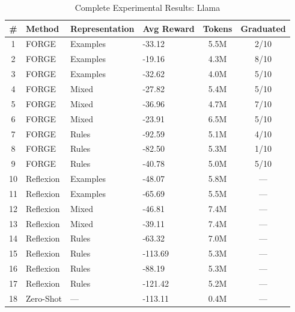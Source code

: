 \documentclass[sigconf]{acmart}
\begin{document}
\begin{table}[htbp]
  \centering
  \scriptsize
  \caption{Complete Experimental Results: Llama}
  \label{tab:full-results-llama}
  \begin{tabular}{clllcc}
  \toprule
  \textbf{\#} & \textbf{Method} & \textbf{Representation} & \textbf{Avg Reward} & \textbf{Tokens} & \textbf{Graduated} \\
  \midrule
  1 & FORGE & Examples & -33.12 & 5.5M & 2/10 \\
  2 & FORGE & Examples & -19.16 & 4.3M & 8/10 \\
  3 & FORGE & Examples & -32.62 & 4.0M & 5/10 \\
  4 & FORGE & Mixed & -27.82 & 5.4M & 5/10 \\
  5 & FORGE & Mixed & -36.96 & 4.7M & 7/10 \\
  6 & FORGE & Mixed & -23.91 & 6.5M & 5/10 \\
  7 & FORGE & Rules & -92.59 & 5.1M & 4/10 \\
  8 & FORGE & Rules & -82.50 & 5.3M & 1/10 \\
  9 & FORGE & Rules & -40.78 & 5.0M & 5/10 \\
  \midrule
  10 & Reflexion & Examples & -48.07 & 5.8M & --- \\
  11 & Reflexion & Examples & -65.69 & 5.5M & --- \\
  12 & Reflexion & Mixed & -46.81 & 7.4M & --- \\
  13 & Reflexion & Mixed & -39.11 & 7.4M & --- \\
  14 & Reflexion & Rules & -63.32 & 7.0M & --- \\
  15 & Reflexion & Rules & -113.69 & 5.3M & --- \\
  16 & Reflexion & Rules & -88.19 & 5.3M & --- \\
  17 & Reflexion & Rules & -121.42 & 5.2M & --- \\
  \midrule
  18 & Zero-Shot & --- & -113.11 & 0.4M & --- \\
  \bottomrule
  \end{tabular}
  \end{table}
  
\end{document}
